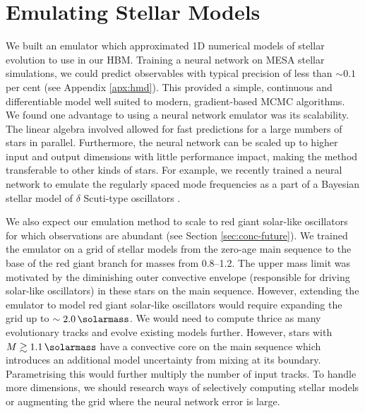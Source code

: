 
\section{Emulating Stellar Models}\label{sec:conc-nn}

We built an emulator which approximated 1D numerical models of stellar evolution to use in our HBM. Training a neural network on MESA stellar simulations, we could predict observables with typical precision of less than \(\sim 0.1\) per cent (see Appendix \ref{apx:hmd}). This provided a simple, continuous and differentiable model well suited to modern, gradient-based MCMC algorithms. We found one advantage to using a neural network emulator was its scalability. The linear algebra involved allowed for fast predictions for a large numbers of stars in parallel. Furthermore, the neural network can be scaled up to higher input and output dimensions with little performance impact, making the method transferable to other kinds of stars. For example, we recently trained a neural network to emulate the regularly spaced mode frequencies as a part of a Bayesian stellar model of \(\delta\) Scuti-type oscillators \citep{Scutt.Murphy.ea2023}.

We also expect our emulation method to scale to red giant solar-like oscillators for which observations are abundant (see Section \ref{sec:conc-future}). We trained the emulator on a grid of stellar models from the zero-age main sequence to the base of the red giant branch for masses from \SIrange{0.8}{1.2}{\solarmass}. The upper mass limit was motivated by the diminishing outer convective envelope (responsible for driving solar-like oscillators) in these stars on the main sequence. However, extending the emulator to model red giant solar-like oscillators would require expanding the grid up to \(\sim\SI{2.0}{\solarmass}\). We would need to compute thrice as many evolutionary tracks and evolve existing models further. However, stars with \(M \gtrsim \SI{1.1}{\solarmass}\) have a convective core on the main sequence which introduces an additional model uncertainty from mixing at its boundary. Parametrising this would further multiply the number of input tracks. To handle more dimensions, we should research ways of selectively computing stellar models or augmenting the grid \citep[e.g.][]{Li.Davies.ea2022} where the neural network error is large.

